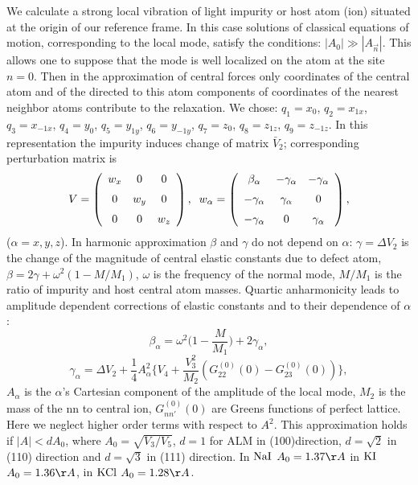 We calculate a strong local vibration of light impurity or host 
atom (ion) situated at the origin of our reference frame. In this case 
solutions of classical equations of motion, 
corresponding to the local mode, satisfy the conditions: 
$|A_{0}| \gg |A_{\vec{n}}|$. This allows one to suppose that the mode is well 
localized on the atom at the site $n=0$. Then in the approximation of central 
forces only coordinates of the central atom and of the directed to this atom 
components of coordinates of the nearest neighbor atoms contribute to the 
relaxation. We chose: 
${q}_1 = {x}_0$, ${q}_2 = {x}_{1x}$, ${q}_3 = {x}_{-1x}$, ${q}_4 = {y}_0$, 
${q}_5 = {y}_{1y}$, ${q}_6 = {y}_{-1y}$, ${q}_7 = {z}_0$, ${q}_8 = {z}_{1z}$, 
${q}_9 = {z}_{-1z}$. In this representation the impurity induces change of 
matrix $\bar{V}_2$; corresponding perturbation matrix is 
\[ V = \left (\begin{array}{ccc} 
w_x&0&0\\\noalign{\medskip} 
0&w_y&0\\\noalign{\medskip} 
0&0&w_z\end{array} 
\right ) , \;\; 
w_{\alpha} = \left (\begin{array}{ccc} 
\beta_{\alpha}&-\gamma_{\alpha}&-\gamma_{\alpha}\\\noalign{\medskip} 
-\gamma_{\alpha}&\gamma_{\alpha}&0\\\noalign{\medskip} 
-\gamma_{\alpha}&0&\gamma_{\alpha}\end{array} 
\right ) , \] 
($\alpha = x,y,z$). In harmonic approximation $\beta$ and $\gamma$ do 
not depend on $\alpha$: $\gamma = \Delta V_2$ is the change of the magnitude 
of central elastic constants due to defect atom,  
$\beta = 2\gamma+\omega^2 (1-M/M_1)$, $\omega$ is the frequency of the
normal 
mode, $M/M_1$ is the ratio of impurity and host central atom masses.
Quartic 
anharmonicity leads to amplitude dependent corrections of elastic constants 
and to their dependence of $\alpha$: 
\[
\beta_{\alpha} = \omega^2{\Big (}1- \frac{M}{M_1}{\Big )}+
2\gamma_{\alpha}, 
\]
\begin{equation}
\gamma_{\alpha} = \Delta V_2+\frac{1}{4}  A^2_{\alpha} {\Big \{ } V_4 +
\frac{V_3^2}{M_2} (G_{22}^{(0)}(0)-G_{23}^{(0)}(0)) {\Big \} }, 
\label{eq:gamma}
\end{equation} 
$A_{\alpha}$ is the $\alpha$'s Cartesian component of the amplitude of the 
local mode, $M_2$ is the mass of the nn to central ion, 
$G_{nn'}^{(0)}(0)$  are Greens functions of perfect lattice.
Here we neglect higher order terms with respect to $A^2$. 
This approximation holds if $ |A| < d A_0$, where $A_0=\sqrt{V_3/V_5}$, 
$d=1$
for ALM in (100)direction, $d=\sqrt{2}$ in (110) direction and $d=\sqrt{3}$
in (111) direction. In ${\rm NaI}$ $A_0 = 1.37 \AA$ in ${\rm KI}$ 
$A_0 = 1.36 \AA$, in ${\rm KCl}$ $A_0= 1.28 \AA$.
   
